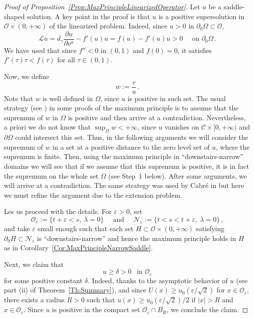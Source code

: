 \documentclass[12pt,reqno]{amsart}
\theoremstyle{definition}
\theoremstyle{remark}
\newcommand{\ccal}{\mathscr{C}}
\newcommand{\ocal}{\mathcal{O}}
\newcommand{\s}{\gamma}
\numberwithin{equation}{section}
\begin{document}
\begin{proof}[Proof of Proposition~\ref{Prop:MaxPrincipleLinearizedOperator}]
Let $u$ be a saddle-shaped solution. A key point in the proof is that $u$ is a positive supersolution in $\ocal\times(0,+\infty)$ of the linearized problem. Indeed, since $u>0$ in $\partial_0\Omega \subset \ocal$,
\begin{equation}
\label{Eq:uSupersolLinearized}
\mathscr{L}u = d_\s \dfrac{\partial u}{\partial \nu^a}  -f'(u) u = f(u) - f'(u) u > 0\quad \text{ on } \partial_0\Omega \,.
\end{equation}
We have used that since $f''<0$ in $(0,1)$ and $f(0)=0$, it satisfies $f'(\tau)\tau < f(\tau)$ for all $\tau\in (0,1)$.


Now, we define
$$
w := \dfrac{v}{u}\,.
$$
Note that $w$ is well defined in $\Omega$, since $u$ is positive in such set. The usual strategy (see \cite{BerestyckiNirembergVaradhan}) in some proofs of the maximum principle is to assume that the supremum of $w$ in $\Omega$ is positive and then arrive at a contradiction.  Nevertheless, a priori we do not know that $\sup_\Omega w< +\infty$, since $u$ vanishes on $\ccal\times [0,+\infty)$ and $\partial \Omega$ could intersect this set. Thus, in the following arguments we will consider the supremum of $w$ in a set at a positive distance to the zero level set of $u$, where the supremum is finite. Then, using the maximum principle in ``downstairs-narrow'' domains we will see that if we assume that this supremum is positive, it is in fact the supremum on the whole set $\Omega$ (see Step~1 below). After some arguments, we will arrive at a contradiction. The same strategy was used by Cabré in \cite{Cabre-Saddle} but here we must refine the argument due to the extension problem.


Les us proceed with the details. For $\varepsilon > 0$, set
$$
\ocal_\varepsilon := \{t +\varepsilon < s,\ \lambda = 0 \} \quad \textrm{ and } \quad \mathcal{N}_\varepsilon := \{t < s < t+\varepsilon ,\ \lambda = 0 \}\,,
$$
and take $\varepsilon$ small enough such that each set $H \subset \ocal \times (0,+\infty)$ satisfying $\partial_0 H \subset \mathcal{N}_\varepsilon$  is ``downstairs-narrow'' and hence the maximum principle holds in $H$ as in Corollary~\ref{Cor:MaxPrincipleNarrowSaddle}. 

Next, we claim that
\begin{equation}
	\label{Eq:u>delta}
	u \geq \delta >0\ \ \text{ in }   \ocal_\varepsilon
\end{equation}
for some positive constant $\delta$. Indeed, thanks to the asymptotic behavior of $u$ (see part (ii) of Theorem~\ref{Th:Summary}), and since $U(x) \geq u_0(\varepsilon/\sqrt{2})$ for $x\in \ocal_\varepsilon$,  there exists a radius $R>0$ such that $u(x) \geq u_0(\varepsilon/\sqrt{2})/2$ if $|x|>R$ and $x\in \ocal_\varepsilon$. Since $u$ is positive in the compact set $\overline{\ocal_\varepsilon} \cap \overline{B_R}$, we conclude the claim.


\end{proof}
\end{document}
